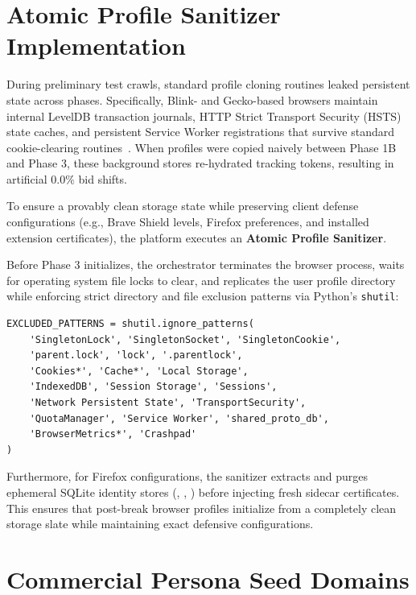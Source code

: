 \section{Atomic Profile Sanitizer Implementation}
\label{sec:appendix_sanitizer}

During preliminary test crawls, standard profile cloning routines leaked persistent state across phases. Specifically, Blink- and Gecko-based browsers maintain internal LevelDB transaction journals, HTTP Strict Transport Security (HSTS) state caches, and persistent Service Worker registrations that survive standard cookie-clearing routines~\cite{acar2014web, whatwg_webstorage}. When profiles were copied naively between Phase 1B and Phase 3, these background stores re-hydrated tracking tokens, resulting in artificial $0.0\%$ bid shifts.

To ensure a provably clean storage state while preserving client defense configurations (e.g., Brave Shield levels, Firefox  preferences, and installed extension certificates), the platform executes an \textbf{Atomic Profile Sanitizer}. 

Before Phase 3 initializes, the orchestrator terminates the browser process, waits for operating system file locks to clear, and replicates the user profile directory while enforcing strict directory and file exclusion patterns via Python's \texttt{shutil}:

\begin{small}
\begin{verbatim}
EXCLUDED_PATTERNS = shutil.ignore_patterns(
    'SingletonLock', 'SingletonSocket', 'SingletonCookie',
    'parent.lock', 'lock', '.parentlock',
    'Cookies*', 'Cache*', 'Local Storage', 
    'IndexedDB', 'Session Storage', 'Sessions',
    'Network Persistent State', 'TransportSecurity',
    'QuotaManager', 'Service Worker', 'shared_proto_db',
    'BrowserMetrics*', 'Crashpad'
)
\end{verbatim}
\end{small}

Furthermore, for Firefox configurations, the sanitizer extracts and purges ephemeral SQLite identity stores (, , ) before injecting fresh sidecar certificates. This ensures that post-break browser profiles initialize from a completely clean storage slate while maintaining exact defensive configurations.


\section{Commercial Persona Seed Domains}
\label{sec:appendix_seeders}

